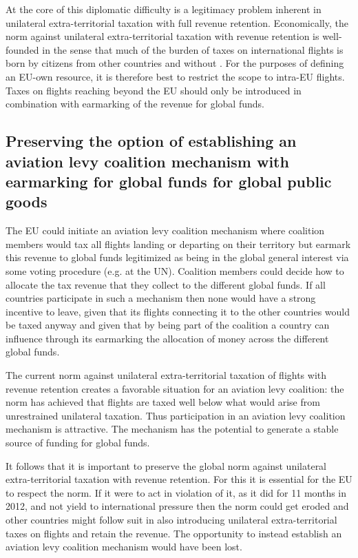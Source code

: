 \documentclass{article}
\newcommand{\mybibliography}{%
}
\begin{document}
At the core of this diplomatic difficulty is a legitimacy problem inherent in unilateral extra-territorial taxation with full revenue retention. Economically, the norm against unilateral extra-territorial taxation with revenue retention is well-founded in the sense that much of the burden of taxes on international flights is born by citizens from other countries and without . For the purposes of defining an EU-own resource, it is therefore best to restrict the scope to intra-EU flights. Taxes on flights reaching beyond the EU should only be introduced in combination with earmarking of the revenue for global funds.

\subsection{Preserving the option of establishing an aviation levy coalition mechanism with earmarking for global funds for global public goods}

The EU could initiate an aviation levy coalition mechanism where coalition members would tax all flights landing or departing on their territory but earmark this revenue to global funds legitimized as being in the global general interest via some voting procedure (e.g. at the UN). Coalition members could decide how to allocate the tax revenue that they collect to the different global funds. If all countries participate in such a mechanism then none would have a strong incentive to leave, given that its flights connecting it to the other countries would be taxed anyway and given that by being part of the coalition a country can influence through its earmarking the allocation of money across the different global funds.

The current norm against unilateral extra-territorial taxation of flights with revenue retention creates a favorable situation for an aviation levy coalition: the norm has achieved that flights are taxed well below what would arise from unrestrained unilateral taxation. Thus participation in an aviation levy coalition mechanism is attractive. The mechanism has the potential to generate a stable source of funding for global funds.

It follows that it is important to preserve the global norm against unilateral extra-territorial taxation with revenue retention. For this it is essential for the EU to respect the norm. If it were to act in violation of it, as it did for 11 months in 2012, and not yield to international pressure then the norm could get eroded and other countries might follow suit in also introducing unilateral extra-territorial taxes on flights and retain the revenue. The opportunity to instead establish an aviation levy coalition mechanism would have been lost.


\mybibliography
\end{document}
